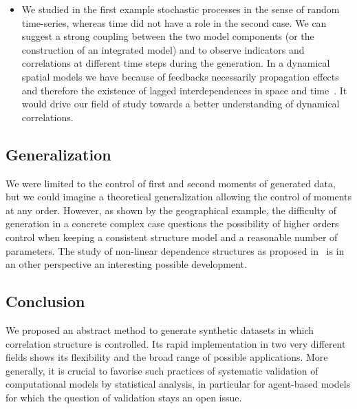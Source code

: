 \begin{itemize}
\item We studied in the first example stochastic processes in the sense of random time-series, whereas time did not have a role in the second case. We can suggest a strong coupling between the two model components (or the construction of an integrated model) and to observe indicators and correlations at different time steps during the generation. In a dynamical spatial models we have because of feedbacks necessarily propagation effects and therefore the existence of lagged interdependences in space and time~\cite{pigozzi1980interurban}. It would drive our field of study towards a better understanding of dynamical correlations.
\end{itemize}




\subsection*{Generalization}

We were limited to the control of first and second moments of generated data, but we could imagine a theoretical generalization allowing the control of moments at any order. However, as shown by the geographical example, the difficulty of generation in a concrete complex case questions the possibility of higher orders control when keeping a consistent structure model and a reasonable number of parameters. The study of non-linear dependence structures as proposed in~\cite{chicheportiche2013nested} is in an other perspective an interesting possible development.






\subsection{Conclusion}


We proposed an abstract method to generate synthetic datasets in which correlation structure is controlled. Its rapid implementation in two very different fields shows its flexibility and the broad range of possible applications. More generally, it is crucial to favorise such practices of systematic validation of computational models by statistical analysis, in particular for agent-based models for which the question of validation stays an open issue.







